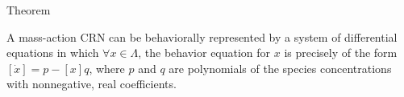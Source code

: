 \begin{frame}{Theorem}
\begin{center}
A mass-action CRN can be behaviorally represented by a system of differential
equations in which $\forall x \in \Lambda$, the behavior equation for $x$ is
precisely of the form $[\dot{x}] = p - [x]q$, where $p$ and $q$ are polynomials
of the species concentrations with nonnegative, real coefficients.
\end{center}
\end{frame}
